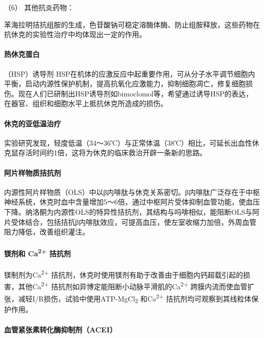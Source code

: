 \hypertarget{text00055.htmlux5cux23CHP2-1-3-3-2-6}{}
（6） 其他抗炎药物：

苯海拉明拮抗组胺的生成，色苷酸钠可稳定溶酶体酶、防止组胺释放，这些药物在抗休克的实验性治疗中均体现出一定的作用。

\paragraph{热休克蛋白}

（HSP）诱导剂
HSP在机体的应激反应中起重要作用，可从分子水平调节细胞内平衡，启动内源性保护机制，提高抗氧化应激能力，抑制细胞凋亡，修复细胞损伤。现在人们已研制出HSP诱导剂如bimoclomol等，希望通过诱导HSP的表达，在器官、组织和细胞水平上抵抗休克所造成的损伤。

\paragraph{休克的亚低温治疗}

实验研究发现，轻度低温（34～36℃）与正常体温（38℃）相比，可延长出血性休克鼠存活时间约1倍，这将为休克的临床救治开辟一条新的思路。

\paragraph{阿片样物质拮抗剂}

内源性阿片样物质（OLS）中以β内啡肽与休克关系密切。β内啡肽广泛存在于中枢神经系统，休克时血中含量增加5～6倍，通过中枢阿片受体抑制血管功能，使血压下降。纳洛酮为内源性OLS的特异性拮抗剂，其结构与吗啡相似，能阻断OLS与阿片受体结合，包括拮抗β内啡肽效应，可提高血压，使左室收缩力加倍，外周血管阻力降低，改善组织灌注。

\paragraph{镁剂和 Ca\textsuperscript{2+} 拮抗剂}

镁制剂为Ca\textsuperscript{2+}
拮抗剂，休克时使用镁剂有助于改善由于细胞内钙超载引起的损害，其他Ca\textsuperscript{2+}
拮抗剂如异博定能阻断小动脉平滑肌的Ca\textsuperscript{2+}
跨膜内流而使血管扩张，减轻I/R损伤，试验中使用ATP-MgCl\textsubscript{2}
和Ca\textsuperscript{2+} 拮抗剂均可观察到其线粒体保护作用。

\paragraph{血管紧张素转化酶抑制剂（ACEI）}

